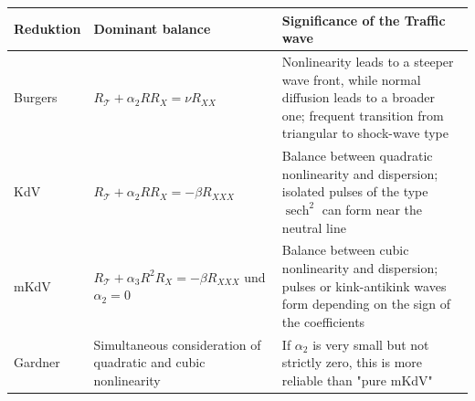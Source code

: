 \documentclass[11pt,a4paper,openany]{book}
\numberwithin{equation}{chapter}
\numberwithin{figure}{chapter}
\numberwithin{table}{chapter}
\begin{document}
\begin{center}
\small
{}
\label{tab:reduced-wave-equations}
\begin{tabular}{p{2.5cm}p{5.5cm}p{5.8cm}}
\toprule
\textbf{Reduktion} & \textbf{Dominant balance} & \textbf{Significance of the Traffic wave} \\
\midrule
Burgers & $R_{\mathcal T}+\alpha_2RR_X=\nu R_{XX}$ &






Nonlinearity leads to a steeper wave front, while normal diffusion leads to a broader one; frequent transition from triangular to shock-wave type





\\[4pt]
KdV & $R_{\mathcal T}+\alpha_2RR_X=-\beta R_{XXX}$ &






Balance between quadratic nonlinearity and dispersion; isolated pulses of the type $\operatorname{sech}^2$ can form near the neutral line





\\[4pt]
mKdV &




 $R_{\mathcal T}+\alpha_3R^2R_X=-\beta R_{XXX}$ und $\alpha_2=0$




&






Balance between cubic nonlinearity and dispersion; pulses or kink-antikink waves form depending on the sign of the coefficients





\\[4pt]
Gardner &






Simultaneous consideration of quadratic and cubic nonlinearity






&






If $\alpha_2$ is very small but not strictly zero, this is more reliable than "pure mKdV"





\\
\bottomrule
\end{tabular}
\end{center}
\end{document}
